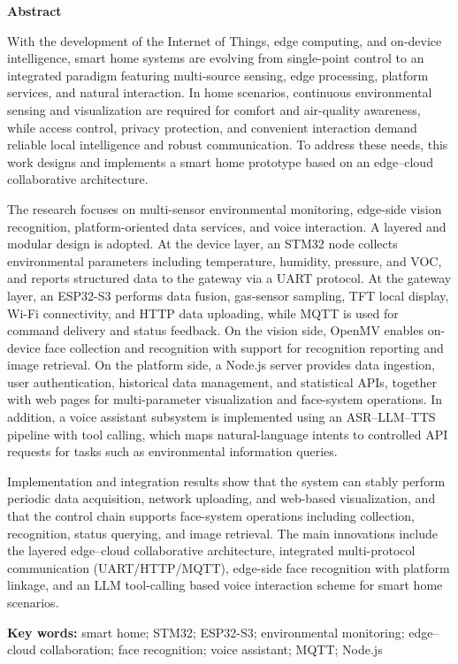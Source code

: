 \vspace{0.5\baselineskip}
\newpage
{
\begin{center}
\textbf{Abstract}
\end{center}
\par With the development of the Internet of Things, edge computing, and on-device intelligence, smart home systems are evolving from single-point control to an integrated paradigm featuring multi-source sensing, edge processing, platform services, and natural interaction. In home scenarios, continuous environmental sensing and visualization are required for comfort and air-quality awareness, while access control, privacy protection, and convenient interaction demand reliable local intelligence and robust communication. To address these needs, this work designs and implements a smart home prototype based on an edge--cloud collaborative architecture.
\par The research focuses on multi-sensor environmental monitoring, edge-side vision recognition, platform-oriented data services, and voice interaction. A layered and modular design is adopted. At the device layer, an STM32 node collects environmental parameters including temperature, humidity, pressure, and VOC, and reports structured data to the gateway via a UART protocol. At the gateway layer, an ESP32-S3 performs data fusion, gas-sensor sampling, TFT local display, Wi-Fi connectivity, and HTTP data uploading, while MQTT is used for command delivery and status feedback. On the vision side, OpenMV enables on-device face collection and recognition with support for recognition reporting and image retrieval. On the platform side, a Node.js server provides data ingestion, user authentication, historical data management, and statistical APIs, together with web pages for multi-parameter visualization and face-system operations. In addition, a voice assistant subsystem is implemented using an ASR--LLM--TTS pipeline with tool calling, which maps natural-language intents to controlled API requests for tasks such as environmental information queries.
\par Implementation and integration results show that the system can stably perform periodic data acquisition, network uploading, and web-based visualization, and that the control chain supports face-system operations including collection, recognition, status querying, and image retrieval. The main innovations include the layered edge--cloud collaborative architecture, integrated multi-protocol communication (UART/HTTP/MQTT), edge-side face recognition with platform linkage, and an LLM tool-calling based voice interaction scheme for smart home scenarios.
\par\noindent\textbf{Key words:} smart home; STM32; ESP32-S3; environmental monitoring; edge--cloud collaboration; face recognition; voice assistant; MQTT; Node.js
}

\newpage
